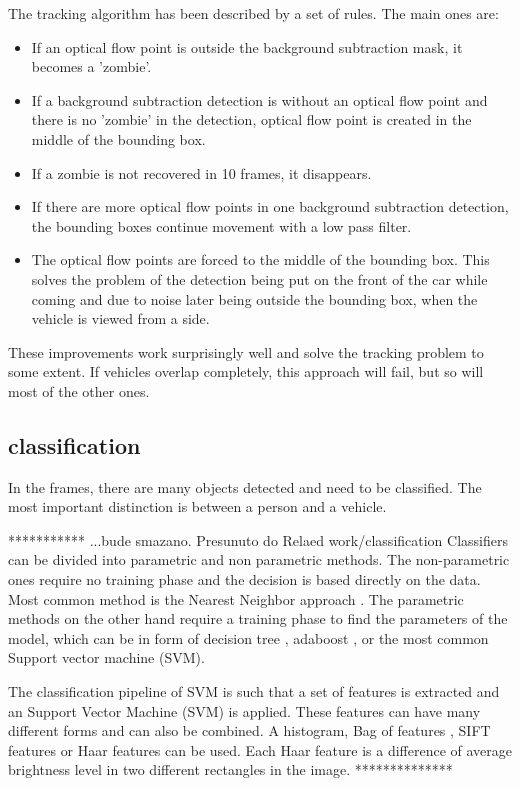 \documentclass[a4paper,12pt,titlepage, twoside]{article}
\numberwithin{figure}{section}
\begin{document}
The tracking algorithm has been described by a set of rules. The main ones are:
\begin{itemize}
	\item If an optical flow point is outside the background subtraction mask, it becomes a 'zombie'.
	\item If a background subtraction detection is without an optical flow point and there is no 'zombie' in the detection, optical flow point is created in the middle of the bounding box. 
	\item If a zombie is not recovered in 10 frames, it disappears. 
	\item If there are more optical flow points in one background subtraction detection, the bounding boxes continue movement with a low pass filter.
	\item The optical flow points are forced to the middle of the bounding box. This solves the problem of the detection being put on the front of the car while coming and due to noise later being outside the bounding box, when the vehicle is viewed from a side. 
\end{itemize}

These improvements work surprisingly well and solve the tracking problem to some extent. If vehicles overlap completely, this approach will fail, but so will most of the other ones. 

\subsection{classification}

In the frames, there are many objects detected and need to be classified. The most important distinction is between a person and a vehicle. 

*********** ...bude smazano. Presunuto do Relaed work/classification
Classifiers can be divided into parametric and non parametric methods. The non-parametric ones require no training phase and the decision is based directly on the data. Most common method is the Nearest Neighbor approach \cite{boiman2008defense, zhang2006svm}. The parametric methods on the other hand require a training phase to find the parameters of the model, which can be in form of decision tree \cite{bosch2007image}, adaboost \cite{opelt2004weak}, or the most common Support vector machine (SVM).

The classification pipeline of SVM is such that a set of features is extracted and an Support Vector Machine (SVM) is applied.  These features can have many different forms and can also be combined. A histogram\cite{chapelle1999support}, Bag of features \cite{lazebnik2006beyond, nowak2006sampling}, SIFT features \cite{yang2009linear, bicego2006use} or Haar features \cite{munder2006experimental} can be used. Each Haar feature is a difference of average brightness level in two different rectangles in the image. 
**************
\end{document}
